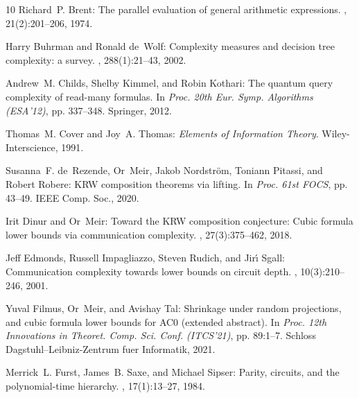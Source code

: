 \begin{thebibliography}{10}
{\sc Richard~P. Brent}: The parallel evaluation of general arithmetic
  expressions.
, 21(2):201--206, 1974.
\newblock [\epfmtdoi{10.1145/321812.321815}]

{\sc Harry Buhrman and Ronald de~Wolf}: Complexity measures and decision tree
  complexity: a survey.
, 288(1):21--43, 2002.
\newblock [\epfmtdoi{10.1016/S0304-3975(01)00144-X}]

{\sc Andrew~M. Childs, Shelby Kimmel, and Robin Kothari}: The quantum query
  complexity of read-many formulas.
\newblock In {\em Proc. 20th Eur. Symp. Algorithms (ESA'12)}, pp. 337--348.
  Springer, 2012.
\newblock [\epfmtdoi{10.1007/978-3-642-33090-2\_30}]

{\sc Thomas~M. Cover and Joy~A. Thomas}: {\em Elements of Information Theory}.
\newblock Wiley-Interscience, 1991.
\newblock [\epfmtdoi{10.1002/047174882X}]

{\sc Susanna~F. de~Rezende, Or~Meir, Jakob Nordstr{\"{o}}m, Toniann Pitassi,
  and Robert Robere}: {KRW} composition theorems via lifting.
\newblock In {\em Proc. 61st FOCS}, pp. 43--49. IEEE Comp. Soc., 2020.

{\sc Irit Dinur and Or~Meir}: Toward the {KRW} composition conjecture: Cubic
  formula lower bounds via communication complexity.
, 27(3):375--462, 2018.
\newblock [\epfmtdoi{10.1007/s00037-017-0159-x}]

{\sc Jeff Edmonds, Russell Impagliazzo, Steven Rudich, and Jir{\'{\i}} Sgall}:
  Communication complexity towards lower bounds on circuit depth.
, 10(3):210--246, 2001.
\newblock [\epfmtdoi{10.1007/s00037-001-8195-x}]

{\sc Yuval Filmus, Or~Meir, and Avishay Tal}: Shrinkage under random
  projections, and cubic formula lower bounds for {AC0} (extended abstract).
\newblock In {\em Proc. 12th Innovations in Theoret. Comp. Sci. Conf.
  (ITCS'21)}, pp. 89:1--7. Schloss Dagstuhl--Leibniz-Zentrum fuer Informatik,
  2021.

{\sc Merrick~L. Furst, James~B. Saxe, and Michael Sipser}: Parity, circuits,
  and the polynomial-time hierarchy.
, 17(1):13--27, 1984.
\newblock [\epfmtdoi{10.1007/BF01744431}]


\end{thebibliography}
